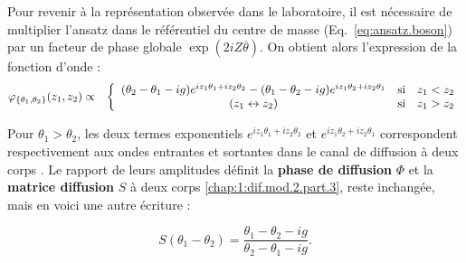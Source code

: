 \medskip


Pour revenir à la représentation observée dans le laboratoire, il est nécessaire de multiplier l’ansatz dans le référentiel du centre de masse (Eq.~\eqref{eq:ansatz.boson}) par un facteur de phase globale \(\exp(2iZ\overline{\theta})\). On obtient alors l’expression de la fonction d’onde :
\begin{eqnarray}\label{eq:I-1-10}
	\varphi_{\{\theta_1 , \theta_2\}}(z_1 , z_2) & \propto &  \left \{ \begin{array} { c cl} ( \theta_2 - \theta_1 - ig) e^{ i z_1 \theta_1 + iz_2 \theta_2 } - ( \theta_1 - \theta_2 - ig) e^{ i z_1 \theta_2 + iz_2 \theta_1} & \mbox{si} & z_1 < z_2 \\ (z_1 \leftrightarrow z_2) & \mbox{si} & z_1 > z_2 \end{array} \right.
\end{eqnarray}



Pour \(\theta_1 > \theta_2\), les deux termes exponentiels 
\(e^{i z_1 \theta_1 + i z_2 \theta_2}\) et \(e^{i z_1 \theta_2 + i z_2 \theta_1}\)
correspondent respectivement aux ondes entrantes et sortantes dans le canal de diffusion à deux corps \cite{Bouchoule_2022}.  
Le rapport de leurs amplitudes définit la {\bf phase de diffusion} $\Phi$ et la  {\bf matrice diffusion} $S$  à deux corps \eqref{chap:1:dif.mod.2.part.3}, reste inchangée, mais en voici une autre écriture :

\begin{equation}\label{chap:1:dif.mod.2.part.4}
	S(\theta_1- \theta_2)  
	= \frac{\theta_1 - \theta_2 - ig}{\theta_2 - \theta_1 - ig}.
\end{equation}

